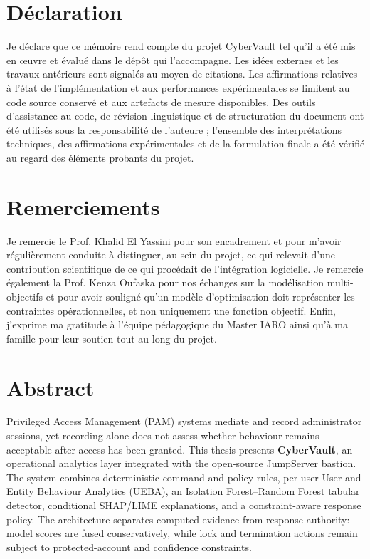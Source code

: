 \documentclass[11pt,a4paper,oneside]{report}
\theoremstyle{definition}
\theoremstyle{plain}
\begin{document}
\chapter*{Déclaration}
Je déclare que ce mémoire rend compte du projet CyberVault tel qu'il a été mis en œuvre et évalué dans le dépôt qui l'accompagne. Les idées externes et les travaux antérieurs sont signalés au moyen de citations. Les affirmations relatives à l'état de l'implémentation et aux performances expérimentales se limitent au code source conservé et aux artefacts de mesure disponibles. Des outils d'assistance au code, de révision linguistique et de structuration du document ont été utilisés sous la responsabilité de l'auteure ; l'ensemble des interprétations techniques, des affirmations expérimentales et de la formulation finale a été vérifié au regard des éléments probants du projet.

\chapter*{Remerciements}
Je remercie le Prof. Khalid El Yassini pour son encadrement et pour m'avoir régulièrement conduite à distinguer, au sein du projet, ce qui relevait d'une contribution scientifique de ce qui procédait de l'intégration logicielle. Je remercie également la Prof. Kenza Oufaska pour nos échanges sur la modélisation multi-objectifs et pour avoir souligné qu'un modèle d'optimisation doit représenter les contraintes opérationnelles, et non uniquement une fonction objectif. Enfin, j'exprime ma gratitude à l'équipe pédagogique du Master IARO ainsi qu'à ma famille pour leur soutien tout au long du projet.

\chapter*{Abstract}
Privileged Access Management (PAM) systems mediate and record administrator sessions, yet recording alone does not assess whether behaviour remains acceptable after access has been granted. This thesis presents \textbf{CyberVault}, an operational analytics layer integrated with the open-source JumpServer bastion. The system combines deterministic command and policy rules, per-user User and Entity Behaviour Analytics (UEBA), an Isolation Forest--Random Forest tabular detector, conditional SHAP/LIME explanations, and a constraint-aware response policy. The architecture separates computed evidence from response authority: model scores are fused conservatively, while lock and termination actions remain subject to protected-account and confidence constraints.
\end{document}
